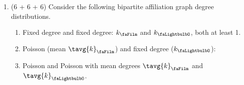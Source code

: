 \begin{enumerate}
  Note: You can of course use something simple like
  $a$ and $b$ instead of the film and lightbulb glyphs.
  Nevertheless, for notation happiness, feel free to use font awesome
  and the following structures:
\begin{verbatim}
\usepackage{fontawesome}

%% random biparite networks

\newcommand{\rbone}{\textnormal{\faFilm}}
\newcommand{\rbtwo}{\textnormal{\faLightbulbO}}

\newcommand{\rboneng}{N_{\rbone}}
\newcommand{\rbtwong}{N_{\rbtwo}}

\newcommand{\Prboneind}{P^{(\rbone)}_{\textnormal{ind},k}}
\newcommand{\Prbtwoind}{P^{(\rbtwo)}_{\textnormal{ind},k}}

\newcommand{\Rrboneind}{R^{(\rbone)}_{\textnormal{ind},k}}
\newcommand{\Rrbtwoind}{R^{(\rbtwo)}_{\textnormal{ind},k}}

\newcommand{\Prboneindplain}{P^{(\rbone)}_{\textnormal{ind}}}
\newcommand{\Prbtwoindplain}{P^{(\rbtwo)}_{\textnormal{ind}}}

\newcommand{\Rrboneindplain}{R^{(\rbone)}_{\textnormal{ind}}}
\newcommand{\Rrbtwoindplain}{R^{(\rbtwo)}_{\textnormal{ind}}}
\end{verbatim}


  Show that the triple-triangle clustering coefficient for the induced 
  networks produced by an arbitrary random bipartite affiliation graph
  are
  $$
  C_{2}^{(\rbone)}
  =
  \frac{
    \rbtwong
  }
  {
    \rboneng
  }
  \frac{
  F_{P^{(\rbtwo)}}'''(1)
  }
  {
    F_{\Prboneindplain}''(1)
  }
  $$
  and
  $$
  C_{2}^{(\rbtwo)}
  =
  \frac{
    \rboneng
  }
  {
    \rbtwong
  }
  \frac{
  F_{P^{(\rbone)}}'''(1)
  }
  {
    F_{\Prbtwoindplain}''(1)
  }
  $$


  
   \solutionstart


   \solutionend


\item (6 + 6 + 6)
  Consider the following bipartite affiliation graph degree distributions.
  \begin{enumerate}
  \item 
    Fixed degree and fixed degree: 
    $k_{\rbone}$ and $k_{\rbtwo}$, both at least 1.
  \item 
    Poisson (mean $\tavg{k}_{\rbone}$) and fixed degree ($k_{\rbtwo}$): 
  \item 
    Poisson and Poisson with mean degrees
    $\tavg{k}_{\rbone}$
    and
    $\tavg{k}_{\rbtwo}$.
  \end{enumerate}


\end{enumerate}
